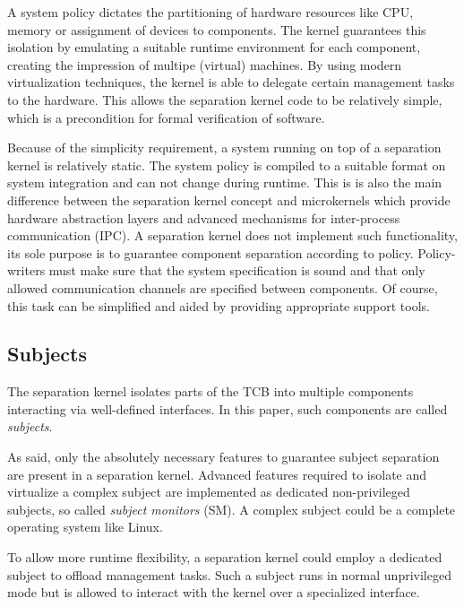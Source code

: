 A system policy dictates the partitioning of hardware resources like CPU,
memory or assignment of devices to components. The kernel guarantees this
isolation by emulating a suitable runtime environment for each component,
creating the impression of multipe (virtual) machines. By using modern
virtualization techniques, the kernel is able to delegate certain management
tasks to the hardware. This allows the separation kernel code to be relatively
simple, which is a precondition for formal verification of software.

Because of the simplicity requirement, a system running on top of a separation
kernel is relatively static. The system policy is compiled to a suitable format
on system integration and can not change during runtime. This is is also the
main difference between the separation kernel concept and microkernels which
provide hardware abstraction layers and advanced mechanisms for inter-process
communication (IPC). A separation kernel does not implement such
functionality, its sole purpose is to guarantee component separation according
to policy. Policy-writers must make sure that the system specification is sound
and that only allowed communication channels are specified between components.
Of course, this task can be simplified and aided by providing appropriate
support tools.

\subsection{Subjects}
The separation kernel isolates parts of the TCB into multiple
components interacting via well-defined interfaces. In this
paper, such components are called \emph{subjects}.

As said, only the absolutely necessary features to guarantee subject separation
are present in a separation kernel. Advanced features required to isolate and
virtualize a complex subject are implemented as dedicated non-privileged
subjects, so called \emph{subject monitors} (SM). A complex subject
could be a complete operating system like Linux.

To allow more runtime flexibility, a separation kernel could employ a dedicated
subject to offload management tasks. Such a subject runs in normal unprivileged
mode but is allowed to interact with the kernel over a specialized interface.

